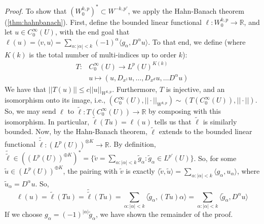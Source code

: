 \documentclass[letterpaper,10pt]{article}
\newcommand{\wkp}{W^{k,p}}
\theoremstyle{definition}
\theoremstyle{remark}
\theoremstyle{plain}
\renewenvironment{proof}{
    \vspace{5pt}
    \begin{mdframed}[bottomline=false,topline=false,rightline=false, skipabove=0]
    \noindent\textit{Proof.}}
{
    \hspace{\fill}\qedsymbol
    \end{mdframed}
}
\begin{document}
\begin{proof}
    To show that $(\wkp_0)^*\subset W^{-k,p'}$, we apply the Hahn-Banach theorem (\ref{thm:hahnbanach}).
    First, define the bounded linear functional $\ell:\wkp_0\rightarrow\mathbb R$,
    and let $u\in C_0^\infty(U)$, with the end goal that $\ell(u)=\langle v,u\rangle
    =\sum_{\alpha:|\alpha|<k}^{}(-1)^\alpha\langle g_\alpha, D^\alpha u\rangle$.
    To that end, we define (where $K(k)$ is the total number of multi-indices
    up to order $k$):
    $$
    \begin{matrix}
        T:  &   C_0^\infty(U)\rightarrow L^p(U)^{K(k)}\\
        &   u\mapsto (u,D_{x^1}u,\ldots,D_{x^d}u,\ldots D^\alpha u) 
    \end{matrix}
    $$
    We have that $||T(u)||\leq c||u||_{\wkp}$.
    Furthermore, $T$ is injective, and an isomorphism onto its image, i.e.,
    $(C_0^\infty(U),||\cdot||_{\wkp})\sim(T(C_0^\infty(U)), ||\cdot||)$.
    So, we may send $\ell$ to $\tilde\ell:T(C_0^\infty(U))\rightarrow\mathbb R$
    by composing with this isomorphism.
    In particular, $\tilde\ell(Tu)=\ell(u)$ tells us that $\tilde\ell$ is similarly
    bounded.
    Now, by the Hahn-Banach theorem, $\tilde\ell$ extends to the bounded linear
    functional $\tilde{\tilde\ell}:(L^p(U))^{\otimes K}\rightarrow\mathbb R$.
    By definition, $\tilde{\tilde\ell}\in \left((L^p(U))^{\oplus K}\right)^*
    =\{\tilde v=\sum_{\alpha:|\alpha|<k}^{}\tilde g_\alpha:\tilde g_\alpha\in L^{p'}(U)\}$.
    So, for some $\tilde u\in (L^{p}(U))^{\oplus K}$, the pairing with $\tilde v$ is 
    exactly $\langle\tilde v,\tilde u\rangle=\sum_{\alpha:|\alpha|<k}^{}\langle g_\alpha,u_\alpha\rangle$,
    where $\tilde u_\alpha=D^\alpha u$.
    So,
    $$
    \ell(u)=
    \tilde\ell(Tu)=\tilde{\tilde\ell}(Tu)
    =\sum_{\alpha:|\alpha|<k}^{}\langle\tilde g_\alpha, (Tu)\alpha\rangle
    =\sum_{\alpha:|\alpha|<k}^{}\langle\tilde g_\alpha, D^\alpha u\rangle
    $$
    If we choose $g_\alpha=(-1)^{|\alpha|}\tilde g_\alpha$, we have shown
    the remainder of the proof.
\end{proof}
\end{document}
